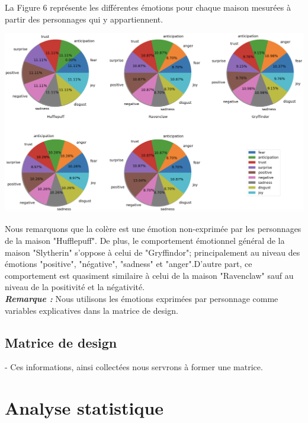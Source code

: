 \documentclass[11pt]{article}
\begin{document}
La Figure 6 représente les différentes émotions pour chaque maison mesurées à partir des personnages qui y appartiennent. 

\begin{center}
    \includegraphics[width= 17 cm]{./figures/emotions_houses.png}
\end{center}

Nous remarquons que la colère est une émotion non-exprimée par les personnages de la maison "Hufflepuff". De plus, le comportement émotionnel général de la maison "Slytherin" s'oppose à celui de "Gryffindor"; principalement au niveau des émotions "positive", "négative", "sadness" et "anger".D'autre part, ce comportement est quasiment similaire à celui de la maison "Ravenclaw" sauf au niveau de la positivité et la négativité.\\

\textbf{\textit{Remarque :}} Nous utilisons les émotions exprimées par personnage comme variables explicatives dans la matrice de design.

\subsection{Matrice de design}

- Ces informations, ainsi collectées nous servrons à former une matrice.


\section{Analyse statistique}
\end{document}
